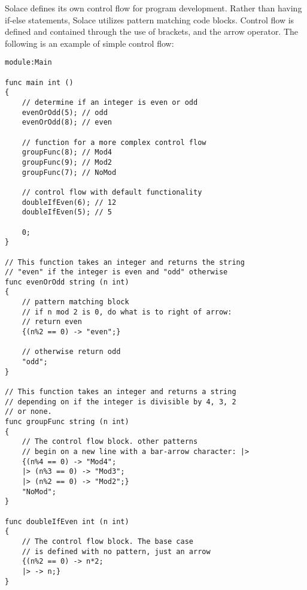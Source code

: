 \documentclass{article}
\begin{document}
Solace defines its own control flow for program development. Rather than having if-else
statements, Solace utilizes pattern matching code blocks. Control flow is defined and
contained through the use of brackets, and the arrow operator. The following is an example
of simple control flow:

\begin{lstlisting}
module:Main

func main int ()
{
	// determine if an integer is even or odd
	evenOrOdd(5); // odd
	evenOrOdd(8); // even
	
	// function for a more complex control flow
	groupFunc(8); // Mod4
	groupFunc(9); // Mod2
	groupFunc(7); // NoMod
	
	// control flow with default functionality
	doubleIfEven(6); // 12
	doubleIfEven(5); // 5
	
	0;
}

// This function takes an integer and returns the string
// "even" if the integer is even and "odd" otherwise
func evenOrOdd string (n int)
{
	// pattern matching block
	// if n mod 2 is 0, do what is to right of arrow:
	// return even
	{(n%2 == 0) -> "even";}
	
	// otherwise return odd
	"odd";
}

// This function takes an integer and returns a string
// depending on if the integer is divisible by 4, 3, 2
// or none.
func groupFunc string (n int)
{
	// The control flow block. other patterns
	// begin on a new line with a bar-arrow character: |>
	{(n%4 == 0) -> "Mod4";
	|> (n%3 == 0) -> "Mod3";
	|> (n%2 == 0) -> "Mod2";}
	"NoMod";
}

func doubleIfEven int (n int)
{
	// The control flow block. The base case
	// is defined with no pattern, just an arrow
	{(n%2 == 0) -> n*2;
	|> -> n;}
}

\end{lstlisting}
\end{document}

